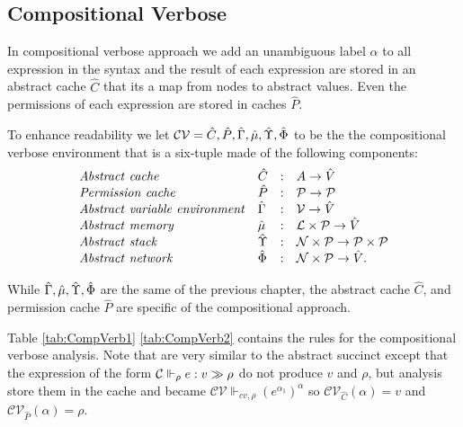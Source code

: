 \newcommand{\all}[0]{\alpha}

\newcommand{\absCV}{\mathcal{CV}}
\newcommand{\cenvs}{\absCV}
\newcommand{\Cat}[0]{\absCV_{\hat{C}}}
\newcommand{\muat}[0]{\absCV_{\hat{\mu}}}
\newcommand{\Env}[0]{\absCV_{\hat{\Gamma}}}
\newcommand{\Pat}[0]{\absCV_{\hat{P}}}
\newcommand{\Phiat}[0]{\absCV_{\hat{\Phi}}}
\newcommand{\Upsat}[0]{\absCV_{\hat{\Upsilon}}}
\newcommand{\ccest}[1]{\cenvs \Vdash_{cv, \rho_s} #1}
\newcommand{\ccestl}[1]{\cenvs \Vdash_{cv, \rho_s} {(#1)}^{\alpha}}
\newcommand{\lbt}[1]{{e_#1}^{\alpha_#1}}

\subsection{Compositional Verbose}
In compositional verbose approach we add an unambiguous label $\all$ to all expression in the syntax and the result of each expression are stored in an abstract cache $\hat{C}$ that its a map from nodes to abstract values. Even the permissions of each expression are stored in caches $\hat{P}$.

To enhance readability we let $\absCV = \hat{C}, \hat{P}, \hat{\Gamma}, \hat{\mu},  \abstack, \absnet$ to be the the compositional verbose environment that is a six-tuple made of the following components:
\[
\begin{array}{llcl}
\mathit{Abstract\ cache} & \hat{C} & : & A \rightarrow \hat{V} \\
\mathit{Permission\ cache} & \hat{P} & : & \mathcal{P} \rightarrow \mathcal{P} \\
\mathit{Abstract\ variable\ environment} & \hat{\Gamma} & : & \mathcal{V} \rightarrow \hat{V} \\
\mathit{Abstract\ memory} & \hat{\mu} & : & {\mathcal L} \times \mathcal{P} \rightarrow \hat{V} \\
\mathit{Abstract\ stack} & \hat{\Upsilon} & : & \mathcal{N} \times \mathcal{P} \rightarrow \mathcal{P} \times \mathcal{P} \\
\mathit{Abstract\ network} & \hat{\Phi} & : & \mathcal{N} \times \mathcal{P} \rightarrow \hat{V}.
\end{array}
\]

While $\hat{\Gamma}, \hat{\mu},  \hat{\Upsilon}, \hat{\Phi}$ are the same of the previous chapter, the abstract cache $\hat{C}$, and permission cache $\hat{P}$ are specific of the compositional approach.

Table \ref{tab:CompVerb1} \ref{tab:CompVerb2} contains the rules for the compositional verbose analysis. Note that are very similar to the abstract succinct except that the expression of the form ${\cal C} \Vdash_\rho e : v \gg \rho$ do not produce $v$ and $\rho$, but analysis store them in the cache and became $\absCV \Vdash_{cv,\rho} (e^{\all_1})^\all$ so $\Cat(\all) = v$ and $\Pat(\all) = \rho$.

